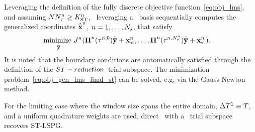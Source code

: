 Leveraging the definition of the fully discrete objective function~\eqref{eq:obj_lms}, and assuming $N N_{\tau}^{n} \ge K_{\text{ST}}^{n}$, \methodAcronym\ leveraging a \spaceTimeAcronym\ basis sequentially computes the generalized coordinates $\hat{\mathbf{\overline{x}}}^{n}$, $n=1,\ldots,N_s$, that satisfy
 \begin{equation}\label{eq:obj_gen_lms_final_st}
\begin{split}
& \underset{\stgenstatey}{\text{minimize } }
\objectiveArgLMS{n} (\stbasisArg{n}{\timeWindowArg{n}{0}} \stgenstatey + \stateInterceptSTArg{n},\ldots,\stbasisArg{n}{\timeWindowArg{n}{\nstepsArg{n}}} \stgenstatey + \stateInterceptSTArg{n}).%
\end{split} 
\end{equation}
It is noted that the boundary conditions are automatically satisfied through the definition of the $ST-reduction$\ trial subspace. The minimization problem~\eqref{eq:obj_gen_lms_final_st} can be solved, e.g, via the Gauss-Newton method.

\begin{remark}
For the limiting case where the window size spans the entire domain, $\Delta T^{1}\equiv T$, and a uniform quadrature weights are used, direct \methodAcronym\ with a \spaceTimeAcronym\ trial subspace recovers ST-LSPG.
\end{remark}

